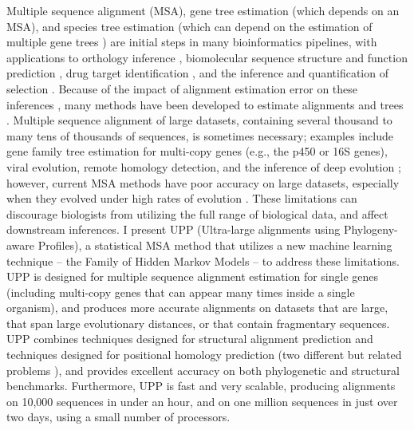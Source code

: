 Multiple sequence alignment (MSA), gene
tree estimation (which depends on an MSA), and species 
tree estimation (which can depend on the estimation
of multiple gene trees \cite{maddison,edwards})
are initial
steps in many bioinformatics pipelines, with applications to
orthology inference 
\cite{Afrasiabi2013},
biomolecular sequence structure and function prediction \cite{Eisen1998},
drug target identification \cite{Abadio2011},
and
the inference and quantification of selection
\cite{EisenFraser2003}.
Because of the impact of alignment estimation
error on these inferences 
\cite{WongSuchardHuelsenbeck2008,FletcherYang,JordanGoldman},
many methods have been developed to estimate
alignments \cite{DoKatoh,RussellMSAbook} and 
trees \cite{felsenstein_inferring_2003}.
Multiple sequence alignment of large datasets, containing
several thousand to many tens of thousands of sequences,
is sometimes necessary; examples include
gene family tree estimation for multi-copy genes
(e.g., the p450 or 16S genes), viral evolution,
remote homology detection,
and the inference of deep evolution \cite{zwickl_increased_2002}; however, 
current MSA methods have poor accuracy on large
datasets, especially when they evolved under
high rates of evolution \cite{Liu2010}.
These limitations can discourage
biologists from utilizing the full range of biological data, and
affect downstream inferences.
I present UPP (Ultra-large alignments using Phylogeny-aware Profiles), 
a statistical MSA method that utilizes
a new machine learning technique -- the Family of Hidden Markov Models --
to address these limitations.
UPP is designed for multiple sequence
alignment estimation 
for single genes (including multi-copy genes
that can appear many times inside a single
organism), 
and produces  more accurate alignments on 
datasets that are large, that span large
evolutionary distances, 
or that contain fragmentary sequences.
UPP combines techniques designed for structural alignment prediction
and techniques designed for positional homology prediction
(two different
but related problems \cite{goldman-benchmark,Reeck1987}),
and provides excellent accuracy on both phylogenetic and
structural benchmarks. Furthermore, UPP is fast and very scalable,
producing alignments on 10,000 sequences in under an hour,
and on one million sequences in just over two days, using
a small number of processors.


